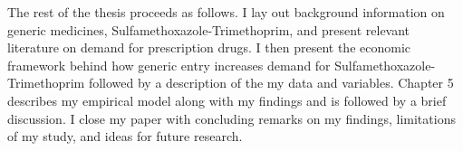\indent The rest of the thesis proceeds as follows. I lay out background information on generic medicines, Sulfamethoxazole-Trimethoprim, and present relevant literature on demand for prescription drugs. I then present the economic framework behind how generic entry increases demand for Sulfamethoxazole-Trimethoprim followed by a description of the my data and variables. Chapter 5 describes my empirical model along with my findings and is followed by a brief discussion. I close my paper with concluding remarks on my findings, limitations of my study, and ideas for future research.
